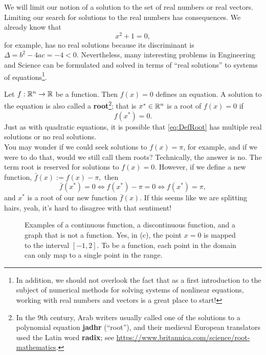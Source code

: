 We will limit our notion of a solution to the set of real numbers or real vectors. Limiting our search for solutions to the real numbers has consequences. We already know that 
$$x^2 + 1=0, $$
for example, has no real solutions because its discriminant is $\Delta = b^2-4 ac = - 4 <0$. Nevertheless, many interesting problems in Engineering and Science can be formulated and solved in terms of ``real solutions'' to systems of equations\footnote{In addition, we should not overlook the fact that as a first introduction to the subject of numerical methods for solving systems of nonlinear equations, working with real numbers and vectors is a great place to start!}. \\

\begin{tcolorbox}[title=\textbf{Root of an Equation}]
 Let $f:\mathbb R^n \to \mathbb R$ be a function. Then $f(x)=0$ defines an equation. A solution to the equation is also called a \textbf{root}\footnote{In the 9th century, Arab writers usually called one of the solutions to a polynomial equation \textbf{jadhr} (“root”), and their medieval European translators used the Latin word \textbf{radix}; see \url{https://www.britannica.com/science/root-mathematics}.}; that is $x^\ast \in \mathbb R^n$ is a root of $f(x)=0$ if
\begin{equation}
    \label{eq:DefRoot}
    f(x^\ast)=0.
\end{equation}
Just as with quadratic equations, it is possible that \eqref{eq:DefRoot} has multiple real solutions or no real solutions.\\

You may wonder if we could seek solutions to $f(x)=\pi$, for example, and if we were to do that, would we still call them roots? Technically, the answer is no. The term root is reserved for solutions to $f(x)=0$. However, if we define a new function, $\bar{f}(x):=f(x)-\pi,$ then 
$$\bar{f}(x^\ast)=0 \iff  f(x^\ast)-\pi = 0 \iff f(x^\ast) = \pi,$$
and $x^\ast$ is a root of our new function $\bar{f}(x)$. If this seems like we are splitting hairs, yeah, it's hard to disagree with that sentiment!
\end{tcolorbox}

    
    \begin{figure}[htb]%
\centering
{}%
\hspace{5pt}%
%
\hspace{5pt}%
%
    \caption[]{Examples of a continuous function, a discontinuous function, and a graph that is not a function. Yes, in (c), the point $x=0$ is mapped to the interval $[-1, 2]$. To be a function, each point in the domain can only map to a single point in the range. }
    \label{fig:ContinuousVsNot}
\end{figure}

